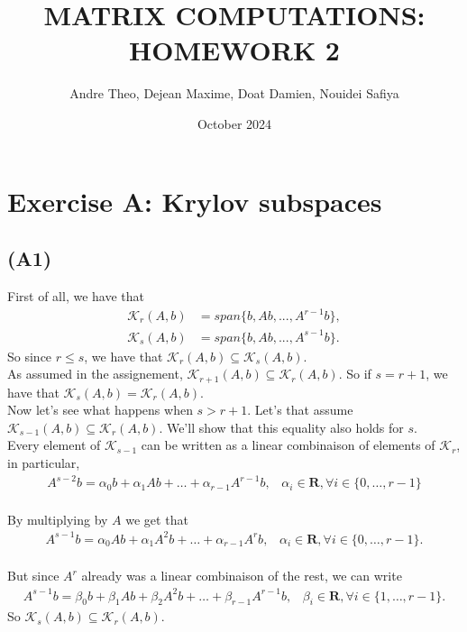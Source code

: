 \documentclass{article}
\title{\textbf{MATRIX COMPUTATIONS: HOMEWORK 2}}  %
\author{Andre Theo,
Dejean Maxime,
Doat Damien,
Nouidei Safiya}
\date{October 2024}
\begin{document}
\maketitle

\section{Exercise A: Krylov subspaces}
\subsection*{(A1)}
First of all, we have that 
\begin{align*}
    \mathcal{K}_{r}(A,b) &=span\{b, Ab, ..., A^{r-1}b\},\\
    \mathcal{K}_{s}(A,b) &=span\{b, Ab, ..., A^{s-1}b\}.
\end{align*}
So since $r\leq s$, we have that $\mathcal{K}_r(A,b) \subseteq \mathcal{K}_s(A,b)$.\\

As assumed in the assignement, $\mathcal{K}_{r+1}(A,b) \subseteq \mathcal{K}_{r}(A,b) $.
So if $s=r+1$, we have that $\mathcal{K}_{s}(A,b)=\mathcal{K}_{r}(A,b)$.\\

Now let's see what happens when $s>r+1$. Let's that assume $\mathcal{K}_{s-1}(A,b)\subseteq\mathcal{K}_{r}(A,b)$. We'll show that this equality also holds for $s$.\\

Every element of $\mathcal{K}_{s-1}$ can be written as a linear combinaison of elements of $\mathcal{K}_{r}$, in particular,
\begin{align*}
    A^{s-2}b = \alpha_0b +\alpha_1Ab + \dots +\alpha_{r-1} A^{r-1}b, \hspace{10pt} \alpha_i \in \mathbf{R}, \forall i \in \{0,\dots,r-1 \}
\end{align*}\\
By multiplying by $A$ we get that
\begin{align*}
    A^{s-1}b = \alpha_0Ab +\alpha_1A^2b + \dots +\alpha_{r-1} A^{r}b, \hspace{10pt} \alpha_i \in \mathbf{R}, \forall i \in \{0,\dots,r-1 \}.
\end{align*}\\
But since $A^r$ already was a linear combinaison of the rest, we can write
\begin{align*}
    A^{s-1}b = \beta_0b + \beta_1Ab +\beta_2A^2b + \dots +\beta_{r-1} A^{r-1}b, \hspace{10pt} \beta_i \in \mathbf{R}, \forall i \in \{1,\dots,r-1 \}.
\end{align*}
So $\mathcal{K}_{s}(A,b)\subseteq\mathcal{K}_{r}(A,b)$.\\
\end{document}
